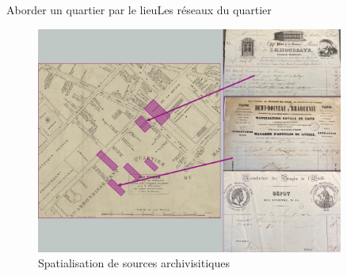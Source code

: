 \documentclass[10pt]{beamer}
\begin{document}
\begin{frame}{Aborder un quartier par le lieu}{Les réseaux du quartier}
	\begin{figure}
		\centering
		\includegraphics[width=0.9\textwidth]{includes/spatial0.png}
		\caption{Spatialisation de sources archivisitiques}
	\end{figure}
\end{frame}
\end{document}
